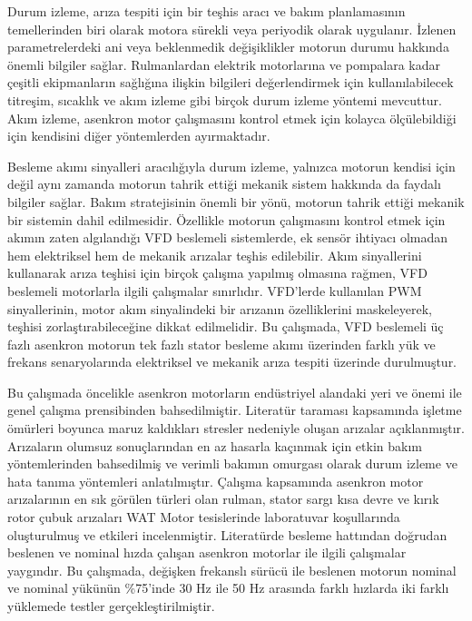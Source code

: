 Durum izleme, arıza tespiti için bir teşhis aracı ve bakım planlamasının temellerinden biri olarak motora sürekli veya periyodik olarak uygulanır. İzlenen parametrelerdeki ani veya beklenmedik değişiklikler motorun durumu hakkında önemli bilgiler sağlar. Rulmanlardan elektrik motorlarına ve pompalara kadar çeşitli ekipmanların sağlığına ilişkin bilgileri değerlendirmek için kullanılabilecek titreşim, sıcaklık ve akım izleme gibi birçok durum izleme yöntemi mevcuttur. Akım izleme, asenkron motor çalışmasını kontrol etmek için kolayca ölçülebildiği için kendisini diğer yöntemlerden ayırmaktadır.

Besleme akımı sinyalleri aracılığıyla durum izleme, yalnızca motorun kendisi için değil aynı zamanda motorun tahrik ettiği mekanik sistem hakkında da faydalı bilgiler sağlar. Bakım stratejisinin önemli bir yönü, motorun tahrik ettiği mekanik bir sistemin dahil edilmesidir. Özellikle motorun çalışmasını kontrol etmek için akımın zaten algılandığı VFD beslemeli sistemlerde, ek sensör ihtiyacı olmadan hem elektriksel hem de mekanik arızalar teşhis edilebilir. Akım sinyallerini kullanarak arıza teşhisi için birçok çalışma yapılmış olmasına rağmen, VFD beslemeli motorlarla ilgili çalışmalar sınırlıdır. VFD'lerde kullanılan PWM sinyallerinin, motor akım sinyalindeki bir arızanın özelliklerini maskeleyerek, teşhisi zorlaştırabileceğine dikkat edilmelidir. Bu çalışmada, VFD beslemeli üç fazlı asenkron motorun tek fazlı stator besleme akımı üzerinden farklı yük ve frekans senaryolarında elektriksel ve mekanik arıza tespiti üzerinde durulmuştur.

Bu çalışmada öncelikle asenkron motorların endüstriyel alandaki yeri ve önemi ile genel çalışma prensibinden bahsedilmiştir. Literatür taraması kapsamında işletme ömürleri boyunca maruz kaldıkları stresler nedeniyle oluşan arızalar açıklanmıştır. Arızaların olumsuz sonuçlarından en az hasarla kaçınmak için etkin bakım yöntemlerinden bahsedilmiş ve verimli bakımın omurgası olarak durum izleme ve hata tanıma yöntemleri anlatılmıştır. Çalışma kapsamında asenkron motor arızalarının en sık görülen türleri olan rulman, stator sargı kısa devre ve kırık rotor çubuk arızaları WAT Motor tesislerinde laboratuvar koşullarında oluşturulmuş ve etkileri incelenmiştir. Literatürde besleme hattından doğrudan beslenen ve nominal hızda çalışan asenkron motorlar ile ilgili çalışmalar yaygındır. Bu çalışmada, değişken frekanslı sürücü ile beslenen motorun nominal ve nominal yükünün \%75'inde 30 Hz ile 50 Hz arasında farklı hızlarda iki farklı yüklemede testler gerçekleştirilmiştir.

